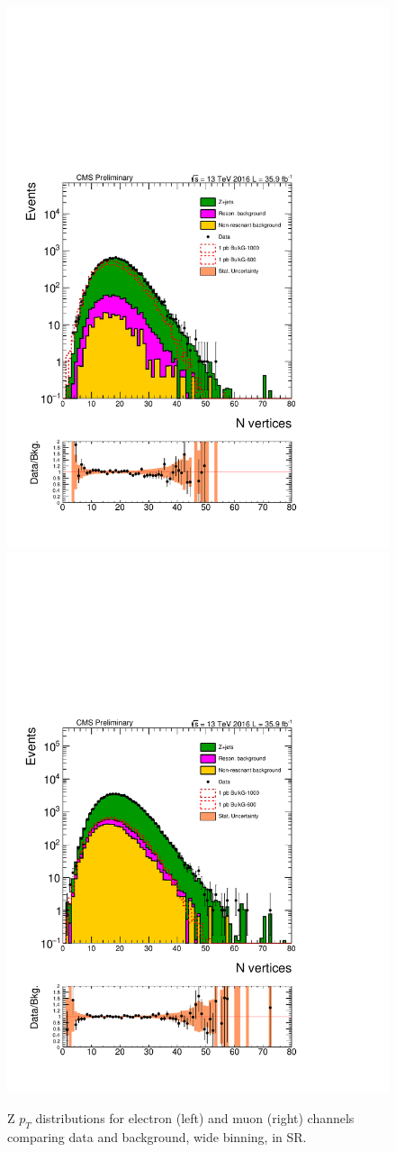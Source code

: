 \begin{figure}[htbp!]
\centering
\includegraphics[width=0.46\linewidth,page=9]{figures/ReMiniSummer16_DT_PhReMiniMCRcFixXsec_GMCPhPtWt_SRdPhiGT0p5_puWeightsummer16_muoneg_gjet_metfilter_unblind_el_log_1pb.pdf}
\includegraphics[width=0.46\linewidth,page=9]{figures/ReMiniSummer16_DT_PhReMiniMCRcFixXsec_GMCPhPtWt_SRdPhiGT0p5_puWeightsummer16_muoneg_gjet_metfilter_unblind_mu_log_1pb.pdf}
\caption{Z $p_T$ distributions for electron (left) and muon (right) channels
comparing data and background,
wide binning, in SR.}
\label{fit:SR_gjet_zpt_wide}
\end{figure}

